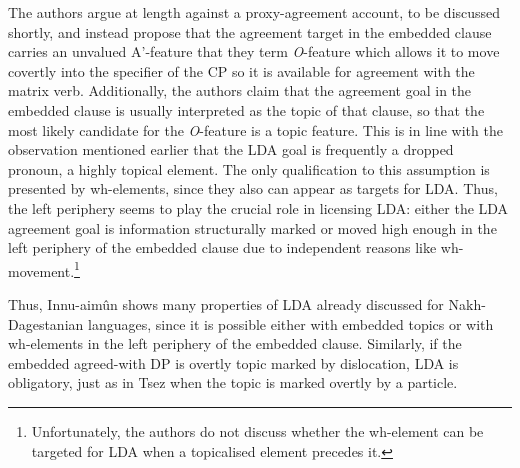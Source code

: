 \documentclass[output=paper
,modfonts
,nonflat]{langsci/langscibook}
\begin{document}
The authors argue at length against a proxy-agreement account, to be discussed shortly, and instead propose that the agreement target in the embedded clause carries an unvalued A'-feature that they term \textit{O}-feature which allows it to move covertly into the specifier of the CP so it is available for agreement with the matrix verb. Additionally, the authors claim that the agreement goal in the embedded clause is usually interpreted as the topic of that clause, so that the most likely candidate for the \textit{O}-feature is a topic feature. This is in line with the observation mentioned earlier that the LDA goal is frequently a dropped pronoun, a highly topical element. The only qualification to this assumption is presented by wh-elements, since they also can appear as targets for LDA. Thus, the left periphery seems to play the crucial role in licensing LDA: either the LDA agreement goal is information structurally marked or moved high enough in the left periphery of the embedded clause due to independent reasons like wh-movement.\footnote{Unfortunately, the authors do not discuss whether the wh-element can be targeted for LDA when a topicalised element precedes it.}

Thus, Innu-aim\^{u}n shows many properties of LDA already discussed for Nakh-Dagestanian languages, since it is possible either with embedded topics or with wh-elements in the left periphery of the embedded clause. Similarly, if the embedded agreed-with DP is overtly topic marked by dislocation, LDA is obligatory, just as in Tsez when the topic is marked overtly by a particle.
\end{document}
